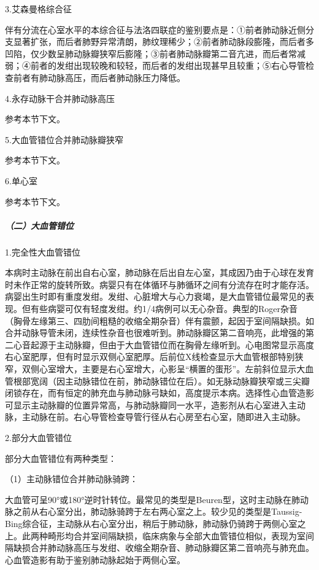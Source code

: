 \hypertarget{text00120.htmlux5cux23CHP14-5-1-5-1-1-3}{}
3.艾森曼格综合征

伴有分流在心室水平的本综合征与法洛四联症的鉴别要点是：①前者肺动脉近侧分支显著扩张，而后者肺野异常清朗，肺纹理稀少；②前者肺动脉段膨隆，而后者多凹陷，仅少数呈肺动脉瓣狭窄后膨隆；③前者肺动脉瓣第二音亢进，而后者常减弱；④前者的发绀出现较晚和较轻，而后者的发绀出现甚早且较重；⑤右心导管检查前者有肺动脉高压，而后者肺动脉压力降低。

\hypertarget{text00120.htmlux5cux23CHP14-5-1-5-1-1-4}{}
4.永存动脉干合并肺动脉高压

参考本节下文。

\hypertarget{text00120.htmlux5cux23CHP14-5-1-5-1-1-5}{}
5.大血管错位合并肺动脉瓣狭窄

参考本节下文。

\hypertarget{text00120.htmlux5cux23CHP14-5-1-5-1-1-6}{}
6.单心室

参考本节下文。

\subparagraph{（二）大血管错位}

\hypertarget{text00120.htmlux5cux23CHP14-5-1-5-1-2-1}{}
1.完全性大血管错位

本病时主动脉在前出自右心室，肺动脉在后出自左心室，其成因乃由于心球在发育时未作正常的旋转所致。病婴只有在体循环与肺循环之间有分流存在时才能存活。病婴出生时即有重度发绀。发绀、心脏增大与心力衰竭，是大血管错位最常见的表现。但有些病婴可仅有轻度发绀。约1/4病例可以无心杂音。典型的Roger杂音（胸骨左缘第三、四肋间粗糙的收缩全期杂音）伴有震颤，起因于室间隔缺损。如合并动脉导管未闭，连续性杂音也很难听到。肺动脉瓣区第二音响亮，此增强的第二心音起源于主动脉瓣，但由于大血管错位而在胸骨左缘听到。心电图常显示高度右心室肥厚，但有时显示双侧心室肥厚。后前位X线检查显示大血管根部特别狭窄，双侧心室增大，主要是右心室增大，心影呈“横置的蛋形”。左前斜位显示大血管根部宽阔（因主动脉错位在前，肺动脉错位在后）。如无脉动脉瓣狭窄或三尖瓣闭锁存在，而有恒定的肺充血与肺动脉弓缺如，高度提示本病。选择性心血管造影可显示主动脉瓣的位置异常高，与肺动脉瓣同一水平，造影剂从右心室进入主动脉，主动脉在前。右心导管检查导管行径从右心房至右心室，随即进入主动脉。

\hypertarget{text00120.htmlux5cux23CHP14-5-1-5-1-2-2}{}
2.部分大血管错位

部分大血管错位有两种类型：

\hypertarget{text00120.htmlux5cux23CHP14-5-1-5-1-2-2-1}{}
（1）主动脉错位合并肺动脉骑跨：

大血管可呈90°或180°逆时针转位。最常见的类型是Beuren型，这时主动脉在肺动脉之前从右心室分出，肺动脉骑跨于左右两心室之上。较少见的类型是Taussig-Bing综合征，主动脉从右心室分出，稍后于肺动脉，肺动脉仍骑跨于两侧心室之上。此两种畸形均合并室间隔缺损，临床病象与全部大血管错位相似，表现为室间隔缺损合并肺动脉高压与发绀、收缩全期杂音、肺动脉瓣区第二音响亮与肺充血。心血管造影有助于鉴别肺动脉起始于两侧心室。

